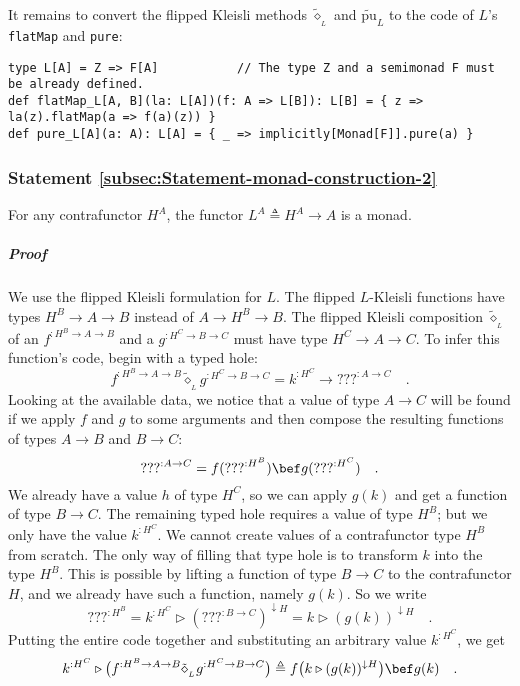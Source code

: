 It remains to convert the flipped Kleisli methods $\tilde{\diamond}_{_{L}}$
and $\tilde{\text{pu}}_{L}$ to the code of $L$\textsf{'}s \lstinline!flatMap!
and \lstinline!pure!:
\begin{lstlisting}
type L[A] = Z => F[A]           // The type Z and a semimonad F must be already defined.
def flatMap_L[A, B](la: L[A])(f: A => L[B]): L[B] = { z => la(z).flatMap(a => f(a)(z)) }
def pure_L[A](a: A): L[A] = { _ => implicitly[Monad[F]].pure(a) }
\end{lstlisting}


\subsubsection{Statement \label{subsec:Statement-monad-construction-2}\ref{subsec:Statement-monad-construction-2}}

For any contrafunctor $H^{A}$, the functor $L^{A}\triangleq H^{A}\rightarrow A$
is a monad.

\subparagraph{Proof}

We use the flipped Kleisli formulation for $L$. The flipped $L$-Kleisli
functions have types $H^{B}\rightarrow A\rightarrow B$ instead of
$A\rightarrow H^{B}\rightarrow B$. The flipped Kleisli composition
$\tilde{\diamond}_{_{L}}$ of an $f^{:H^{B}\rightarrow A\rightarrow B}$
and a $g^{:H^{C}\rightarrow B\rightarrow C}$ must have type $H^{C}\rightarrow A\rightarrow C$.
To infer this function\textsf{'}s code, begin with a typed hole:
\[
f^{:H^{B}\rightarrow A\rightarrow B}\tilde{\diamond}_{_{L}}g^{:H^{C}\rightarrow B\rightarrow C}=k^{:H^{C}}\rightarrow\text{???}^{:A\rightarrow C}\quad.
\]
Looking at the available data, we notice that a value of type $A\rightarrow C$
will be found if we apply $f$ and $g$ to some arguments and then
compose the resulting functions of types $A\rightarrow B$ and $B\rightarrow C$:
\[
\text{???}^{:A\rightarrow C}=f(\text{???}^{:H^{B}})\bef g(\text{???}^{:H^{C}})\quad.
\]
We already have a value $h$ of type $H^{C}$, so we can apply $g(k)$
and get a function of type $B\rightarrow C$. The remaining typed
hole requires a value of type $H^{B}$; but we only have the value
$k^{:H^{C}}$. We cannot create values of a contrafunctor type $H^{B}$
from scratch. The only way of filling that type hole is to transform
$k$ into the type $H^{B}$. This is possible by lifting a function
of type $B\rightarrow C$ to the contrafunctor $H$, and we already
have such a function, namely $g(k)$. So we write
\[
\text{???}^{:H^{B}}=k^{:H^{C}}\triangleright(\text{???}^{:B\rightarrow C})^{\downarrow H}=k\triangleright(g(k))^{\downarrow H}\quad.
\]
Putting the entire code together and substituting an arbitrary value
$k^{:H^{C}}$, we get
\begin{equation}
k^{:H^{C}}\triangleright\big(f^{:H^{B}\rightarrow A\rightarrow B}\tilde{\diamond}_{_{L}}g^{:H^{C}\rightarrow B\rightarrow C}\big)\triangleq f\big(k\triangleright(g(k))^{\downarrow H}\big)\bef g(k)\quad.\label{eq:def-of-Kleisli-for-exp-construction-h-a-a}
\end{equation}

